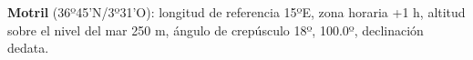 \documentclass[12pt]{article}
\begin{document}
 \footnotesize \noindent \textbf{Motril} (36º45'N/3º31'O): longitud
 de referencia 15ºE, zona horaria +1 h, altitud sobre el nivel del mar
 250 m, \'angulo de crep\'usculo 18º, \arabfalse\transtrue {}
 100.0º, declinaci\'on dedata.



 
\end{document}
